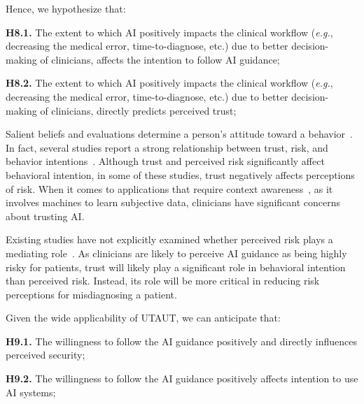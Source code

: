 \vspace{2.25mm}

\noindent
Hence, we hypothesize that:

\vspace{2.25mm}

\noindent
{\bf H8.1.} The extent to which AI positively impacts the clinical workflow ({\it e.g.}, decreasing the medical error, time-to-diagnose, etc.) due to better decision-making of clinicians, affects the intention to follow AI guidance;

\vspace{2.25mm}

\noindent
{\bf H8.2.} The extent to which AI positively impacts the clinical workflow ({\it e.g.}, decreasing the medical error, time-to-diagnose, etc.) due to better decision-making of clinicians, directly predicts perceived trust;

\vspace{2.25mm}

Salient beliefs and evaluations determine a person's attitude toward a behavior~\cite{KHALILZADEH2017460}.
In fact, several studies report a strong relationship between trust, risk, and behavior intentions~\cite{GANSSER2021101535, 9197782, https://doi.org/10.1002/mar.20823}.
Although trust and perceived risk significantly affect behavioral intention, in some of these studies, trust negatively affects perceptions of risk.
When it comes to applications that require context awareness~\cite{10.1145/3313831.3376506}, as it involves machines to learn subjective data, clinicians have significant concerns about trusting AI.

Existing studies have not explicitly examined whether perceived risk plays a mediating role~\cite{AMEEN2021106548}.
As clinicians are likely to perceive AI guidance as being highly risky for patients, trust will likely play a significant role in behavioral intention than perceived risk.
Instead, its role will be more critical in reducing risk perceptions for misdiagnosing a patient.

\noindent
Given the wide applicability of UTAUT, we can anticipate that:

\vspace{2.25mm}

\noindent
{\bf H9.1.} The willingness to follow the AI guidance positively and directly influences perceived security;

\vspace{2.25mm}

\noindent
{\bf H9.2.} The willingness to follow the AI guidance positively affects intention to use AI systems;

